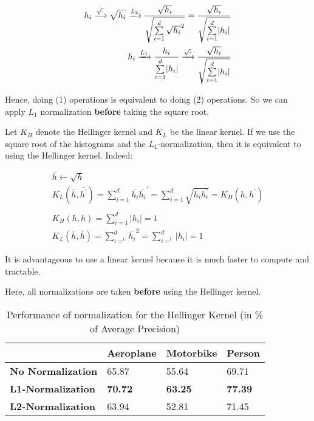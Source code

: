 \documentclass{article}
\DeclarePairedDelimiter\abs{\lvert}{\rvert}%
\begin{document}
\begin{align}
h_i \xrightarrow{\sqrt{.}} \sqrt{h_i} \xrightarrow{L_2} \frac{\sqrt{h_i}}{\sqrt{\sum\limits_{i=1}^d \sqrt{h_i}^2}} = \frac{\sqrt{h_i}}{\sqrt{\sum\limits_{i=1}^d \abs{h_i}}} \\
h_i \xrightarrow{L_1} \frac{h_i}{\sum\limits_{i=1}^d \abs{h_i}} \xrightarrow{\sqrt{.}} \frac{\sqrt{h_i}}{\sqrt{\sum\limits_{i=1}^d \abs{h_i}}}
\end{align}

Hence, doing (1) operations is equivalent to doing (2) operations. So we can apply $L_1$ normalization \textbf{before} taking the square root.



Let $K_H$ denote the Hellinger kernel and $K_L$ be the linear kernel. If we use the square root of the histograms and the $L_1$-normalization, then
it is equivalent to using the Hellinger kernel. Indeed:

\begin{align*}
\bar{h} \leftarrow \sqrt{h} \\
K_L(\bar{h},\bar{h^{\prime}}) = \sum\limits_{i=1}^d \bar{h_i}\bar{h_i}^{\prime} = \sum\limits_{i=1}^d \sqrt{h_i h^{\prime} _i}= K_H(h,h^{\prime}) \\
\\
K_H(h,h) = \sum\limits_{i=1}^d |h_i| = 1 \\
K_L(\bar{h},\bar{h}) = \sum\limits_{i=^1}^d \bar{h_i}^2 = \sum\limits_{i=^1}^d |h_i| = 1
\end{align*}

It is advantageous to use a linear kernel because it is much faster to compute and tractable.



Here, all normalizations are taken \textbf{before} using the Hellinger kernel.

\begin{table}[H]
\centering
\begin{tabular}{@{}llll@{}}
\toprule
{\color[HTML]{000000} \textbf{}} & {\color[HTML]{000000} \textbf{Aeroplane}} & {\color[HTML]{000000} \textbf{Motorbike}} & {\color[HTML]{000000} \textbf{Person}} \\ \midrule
\textbf{No Normalization} & 65.87 & 55.64 & 69.71 \\
\textbf{L1-Normalization} & \textbf{70.72} & \textbf{63.25} & \textbf{77.39} \\
\textbf{L2-Normalization} & 63.94 & 52.81 & 71.45 \\ \bottomrule
\end{tabular}
\caption{Performance of normalization for the Hellinger Kernel (in \% of Average Precision)}
\label{my-label2}
\end{table}
\end{document}
